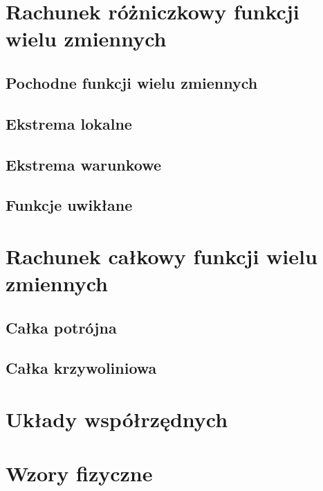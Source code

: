 \documentclass[polish,pretty]{angav}
\begin{document}
    \section{Rachunek różniczkowy funkcji wielu zmiennych}
    
        \subsection{Pochodne funkcji wielu zmiennych}
        
        \subsection{Ekstrema lokalne}
        
        \subsection{Ekstrema warunkowe}
        
        \subsection{Funkcje uwikłane}
        

    \section{Rachunek całkowy funkcji wielu zmiennych}
    
        \subsection{Całka potrójna}
        
        \subsection{Całka krzywoliniowa}
        


    \appendix

    \section{Układy współrzędnych} \label{s:coordinate systems}
    

    \section{Wzory fizyczne} \label{s:physics formulas}
    
\end{document}
